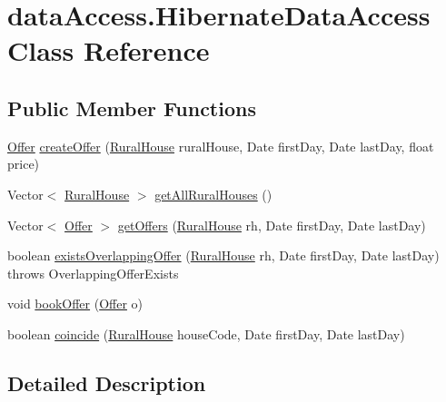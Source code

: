 \hypertarget{classdataAccess_1_1HibernateDataAccess}{}\section{data\+Access.\+Hibernate\+Data\+Access Class Reference}
\label{classdataAccess_1_1HibernateDataAccess}
\subsection*{Public Member Functions}
\begin{DoxyCompactItemize}
\item 
\mbox{\hyperlink{classdomain_1_1Offer}{Offer}} \mbox{\hyperlink{classdataAccess_1_1HibernateDataAccess_a2d226cc2032db6a4522fc6e172315480}{create\+Offer}} (\mbox{\hyperlink{classdomain_1_1RuralHouse}{Rural\+House}} rural\+House, Date first\+Day, Date last\+Day, float price)
\item 
Vector$<$ \mbox{\hyperlink{classdomain_1_1RuralHouse}{Rural\+House}} $>$ \mbox{\hyperlink{classdataAccess_1_1HibernateDataAccess_a3e70561f64924c0a6c5a1edfbc5528da}{get\+All\+Rural\+Houses}} ()
\item 
Vector$<$ \mbox{\hyperlink{classdomain_1_1Offer}{Offer}} $>$ \mbox{\hyperlink{classdataAccess_1_1HibernateDataAccess_a60f1f7e00fb7ccec7fbb799e8a302295}{get\+Offers}} (\mbox{\hyperlink{classdomain_1_1RuralHouse}{Rural\+House}} rh, Date first\+Day, Date last\+Day)
\item 
boolean \mbox{\hyperlink{classdataAccess_1_1HibernateDataAccess_aae72706f749c3cb823d6002f979835c7}{exists\+Overlapping\+Offer}} (\mbox{\hyperlink{classdomain_1_1RuralHouse}{Rural\+House}} rh, Date first\+Day, Date last\+Day)  throws Overlapping\+Offer\+Exists 
\item 
void \mbox{\hyperlink{classdataAccess_1_1HibernateDataAccess_a16a54ece6133abc98eae6b61daa9d4db}{book\+Offer}} (\mbox{\hyperlink{classdomain_1_1Offer}{Offer}} o)
\item 
boolean \mbox{\hyperlink{classdataAccess_1_1HibernateDataAccess_a20de01b8c85e851ca310123cb7e6037d}{coincide}} (\mbox{\hyperlink{classdomain_1_1RuralHouse}{Rural\+House}} house\+Code, Date first\+Day, Date last\+Day)
\end{DoxyCompactItemize}


\subsection{Detailed Description}


